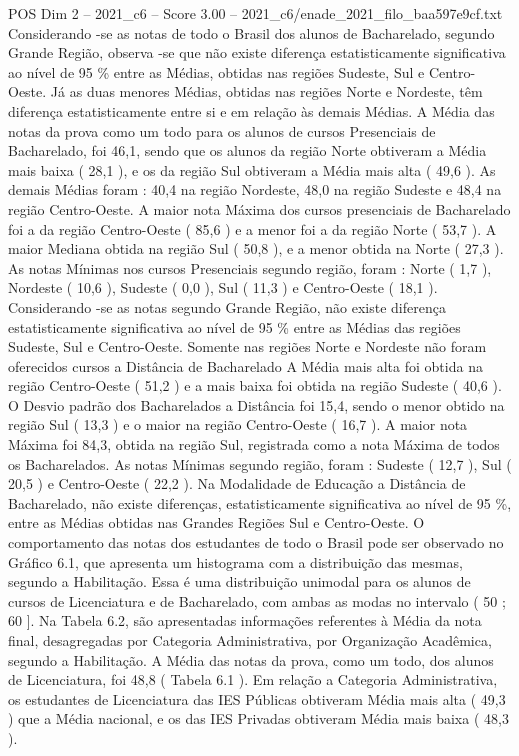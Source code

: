 \begin{textsample}{POS Dim 2 – 2021\_c6 – Score 3.00 – 2021\_c6/enade\_2021\_filo\_baa597e9cf.txt}
Considerando -se as notas de todo o Brasil dos alunos de Bacharelado, segundo Grande Região, observa -se que não existe diferença estatisticamente significativa ao nível de 95 \% entre as Médias, obtidas nas regiões Sudeste, Sul e Centro-Oeste.
Já as duas menores Médias, obtidas nas regiões Norte e Nordeste, têm diferença estatisticamente entre si e em relação às demais Médias.
A Média das notas da prova como um todo para os alunos de cursos Presenciais de Bacharelado, foi 46,1, sendo que os alunos da região Norte obtiveram a Média mais baixa ( 28,1 ), e os da região Sul obtiveram a Média mais alta ( 49,6 ).
As demais Médias foram : 40,4 na região Nordeste, 48,0 na região Sudeste e 48,4 na região Centro-Oeste.
A maior nota Máxima dos cursos presenciais de Bacharelado foi a da região Centro-Oeste ( 85,6 ) e a menor foi a da região Norte ( 53,7 ).
A maior Mediana obtida na região Sul ( 50,8 ), e a menor obtida na Norte ( 27,3 ).
As notas Mínimas nos cursos Presenciais segundo região, foram : Norte ( 1,7 ), Nordeste ( 10,6 ), Sudeste ( 0,0 ), Sul ( 11,3 ) e Centro-Oeste ( 18,1 ).
Considerando -se as notas segundo Grande Região, não existe diferença estatisticamente significativa ao nível de 95 \% entre as Médias das regiões Sudeste, Sul e Centro-Oeste.
Somente nas regiões Norte e Nordeste não foram oferecidos cursos a Distância de Bacharelado A Média mais alta foi obtida na região Centro-Oeste ( 51,2 ) e a mais baixa foi obtida na região Sudeste ( 40,6 ).
O Desvio padrão dos Bacharelados a Distância foi 15,4, sendo o menor obtido na região Sul ( 13,3 ) e o maior na região Centro-Oeste ( 16,7 ).
A maior nota Máxima foi 84,3, obtida na região Sul, registrada como a nota Máxima de todos os Bacharelados.
As notas Mínimas segundo região, foram : Sudeste ( 12,7 ), Sul ( 20,5 ) e Centro-Oeste ( 22,2 ).
Na Modalidade de Educação a Distância de Bacharelado, não existe diferenças, estatisticamente significativa ao nível de 95 \%, entre as Médias obtidas nas Grandes Regiões Sul e Centro-Oeste.
O comportamento das notas dos estudantes de todo o Brasil pode ser observado no Gráfico 6.1, que apresenta um histograma com a distribuição das mesmas, segundo a Habilitação.
Essa é uma distribuição unimodal para os alunos de cursos de Licenciatura e de Bacharelado, com ambas as modas no intervalo ( 50 ; 60 ].
Na Tabela 6.2, são apresentadas informações referentes à Média da nota final, desagregadas por Categoria Administrativa, por Organização Acadêmica, segundo a Habilitação.
A Média das notas da prova, como um todo, dos alunos de Licenciatura, foi 48,8 ( Tabela 6.1 ).
Em relação a Categoria Administrativa, os estudantes de Licenciatura das IES Públicas obtiveram Média mais alta ( 49,3 ) que a Média nacional, e os das IES Privadas obtiveram Média mais baixa ( 48,3 ).

\end{textsample}
